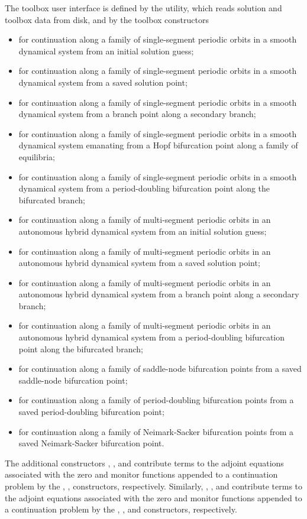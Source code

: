 The toolbox user interface is defined by the  utility, which reads solution and toolbox data from disk, and by the toolbox constructors
\begin{itemize}
\item  {} for continuation along a family of single-segment periodic orbits in a smooth dynamical system from an initial solution guess;
\item {} for continuation along a family of single-segment periodic orbits in a smooth dynamical system from a saved solution point;
\item {} for continuation along a family of single-segment periodic orbits in a smooth dynamical system from a branch point along a secondary branch;
\item {} for continuation along a family of single-segment periodic orbits in a smooth dynamical system emanating from a Hopf bifurcation point along a family of equilibria;
\item {} for continuation along a family of single-segment periodic orbits in a smooth dynamical system from a period-doubling bifurcation point along the bifurcated branch;
\item  {} for continuation along a family of multi-segment periodic orbits in an autonomous hybrid dynamical system from an initial solution guess;
\item {} for continuation along a family of multi-segment periodic orbits in an autonomous hybrid dynamical system from a saved solution point;
\item {} for continuation along a family of multi-segment periodic orbits in an autonomous hybrid dynamical system from a branch point along a secondary branch;
\item {} for continuation along a family of multi-segment periodic orbits in an autonomous hybrid dynamical system from a period-doubling bifurcation point along the bifurcated branch;
\item {} for continuation along a family of saddle-node bifurcation points from a saved saddle-node bifurcation point;
\item {} for continuation along a family of period-doubling bifurcation points from a saved period-doubling bifurcation point;
\item {} for continuation along a family of Neimark-Sacker bifurcation points from a saved Neimark-Sacker bifurcation point.
\end{itemize}
The additional constructors , , and  contribute terms to the adjoint equations associated with the zero and monitor functions appended to a continuation problem by the , ,  constructors, respectively. Similarly, , , and  contribute terms to the adjoint equations associated with the zero and monitor functions appended to a continuation problem by the , , and  constructors, respectively.

